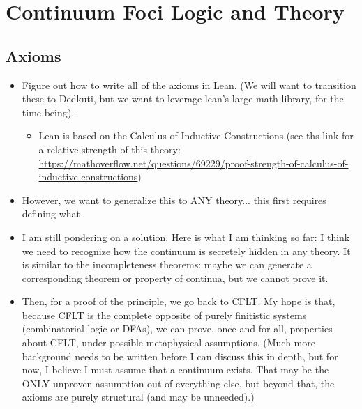 
\chapter{Continuum Foci Logic and Theory}
\label{ch:cflt}

\newcommand*{\foldth}{\mathbf{Fold}}
\newcommand*{\foldthd}{\mathbf{Fold_0}}

\section{Axioms}
\begin{itemize}
  \item Figure out how to write all of the axioms in Lean. (We will want to transition these to Dedkuti, but we want to leverage lean's large math library, for the time being).
    \begin{itemize}
      \item Lean is based on the Calculus of Inductive Constructions (see ths link for a relative strength of this theory: \url{https://mathoverflow.net/questions/69229/proof-strength-of-calculus-of-inductive-constructions})
    \end{itemize}
       \item However, we want to generalize this to ANY theory... this first requires defining what 
      \item I am still pondering on a solution. Here is what I am thinking so far: I think we need to recognize how the continuum is secretely hidden in any theory. It is similar to the incompleteness theorems: maybe we can generate a corresponding theorem or property of continua, but we cannot prove it.
      \item Then, for a proof of the principle, we go back to CFLT. My hope is that, because CFLT is the complete opposite of purely finitistic systems (combinatorial logic or DFAs), we can prove, once and for all, properties about CFLT, under possible metaphysical assumptions. (Much more background needs to be written before I can discuss this in depth, but for now, I believe I must assume that a continuum exists. That may be the ONLY unproven assumption out of everything else, but beyond that, the axioms are purely structural (and may be unneeded).)
\end{itemize}

